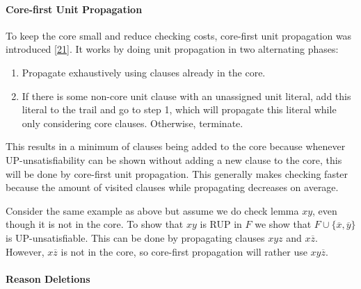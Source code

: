 \documentclass[
]{report}
\providecommand{\tightlist}{%
  \setlength{\itemsep}{0pt}\setlength{\parskip}{0pt}}
\begin{document}
\paragraph{Core-first Unit Propagation}

To keep the core small and reduce checking costs, core-first unit
propagation was introduced
{[}\protect\hyperlink{ref-DBLP:confux2ffmcadux2fHeuleHW13}{21}{]}. It
works by doing unit propagation in two alternating phases:

\begin{enumerate}
\def\labelenumi{\arabic{enumi}.}
\tightlist
\item
  Propagate exhaustively using clauses already in the core.
\item
  If there is some non-core unit clause with an unassigned unit literal,
  add this literal to the trail and go to step 1, which will propagate
  this literal while only considering core clauses. Otherwise,
  terminate.
\end{enumerate}

This results in a minimum of clauses being added to the core because
whenever UP-unsatisfiability can be shown without adding a new clause to
the core, this will be done by core-first unit propagation. This
generally makes checking faster because the amount of visited clauses
while propagating decreases on average.

Consider the same example as above but assume we do check lemma \(xy\),
even though it is not in the core. To show that \(xy\) is RUP in \(F\)
we show that \(F \cup \{\overline{x}, \overline{y}\}\) is
UP-unsatisfiable. This can be done by propagating clauses \(xyz\) and
\(x\overline{z}\). However, \(x\overline{z}\) is not in the core, so
core-first propagation will rather use \(xy\overline{z}\).

\paragraph{Reason Deletions}
\end{document}
